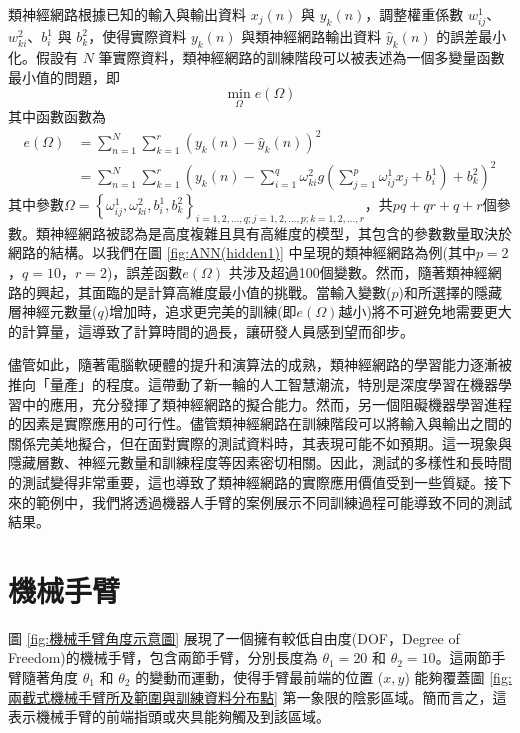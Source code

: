 類神經網路根據已知的輸入與輸出資料 $x_j(n)$ 與 $y_k(n)$，調整權重係數 $w^1_{ij}$、$w^2_{ki}$、$b^1_i$ 與 $b^2_k$，使得實際資料 $y_k(n)$ 與類神經網路輸出資料 $\hat{y}_k(n)$ 的誤差最小化。假設有 $N$ 筆實際資料，類神經網路的訓練階段可以被表述為一個多變量函數最小值的問題，即
\begin{equation}\label{eq:ANN-3}
\min_{\Omega} e(\Omega)
\end{equation}
其中函數函數為
\begin{align}\label{eq:ANN-4}\nonumber
e(\Omega)&=\sum_{n=1}^N\sum_{k=1}^r\left(y_k(n)-\hat{y}_k(n)\right)^2 \\
&=\sum_{n=1}^N\sum_{k=1}^r\left(y_k(n)-\sum_{i=1}^q\omega^2_{ki}g\left(\sum_{j=1}^p\omega^1_{ij}x_j+b^1_i\right)+b^2_k\right)^2
\end{align}
其中參數$\Omega=\left\{\omega^1_{ij},\omega^2_{ki},b^1_i,b^2_k \right\}_{i=1,2,\dots,q;j=1,2,\dots,p;k=1,2,\dots,r}$，共$pq+qr+q+r$個參數。類神經網路被認為是高度複雜且具有高維度的模型，其包含的參數數量取決於網路的結構。以我們在圖 \ref{fig:ANN(hidden1)} 中呈現的類神經網路為例(其中$p=2$，$q=10$，$r=2$)，誤差函數$e(\Omega)$ 共涉及超過100個變數。然而，隨著類神經網路的興起，其面臨的是計算高維度最小值的挑戰。當輸入變數($p$)和所選擇的隱藏層神經元數量($q$)增加時，追求更完美的訓練(即$e(\Omega)$越小)將不可避免地需要更大的計算量，這導致了計算時間的過長，讓研發人員感到望而卻步。

儘管如此，隨著電腦軟硬體的提升和演算法的成熟，類神經網路的學習能力逐漸被推向「量產」的程度。這帶動了新一輪的人工智慧潮流，特別是深度學習在機器學習中的應用，充分發揮了類神經網路的擬合能力。然而，另一個阻礙機器學習進程的因素是實際應用的可行性。儘管類神經網路在訓練階段可以將輸入與輸出之間的關係完美地擬合，但在面對實際的測試資料時，其表現可能不如預期。這一現象與隱藏層數、神經元數量和訓練程度等因素密切相關。因此，測試的多樣性和長時間的測試變得非常重要，這也導致了類神經網路的實際應用價值受到一些質疑。接下來的範例中，我們將透過機器人手臂的案例展示不同訓練過程可能導致不同的測試結果。
\section{機械手臂}
圖 \ref{fig:機械手臂角度示意圖} 展現了一個擁有較低自由度(DOF，Degree of Freedom)的機械手臂，包含兩節手臂，分別長度為 $\theta _1 = 20$ 和 $\theta _2 = 10$。這兩節手臂隨著角度 $\theta _1$ 和 $\theta _2$ 的變動而運動，使得手臂最前端的位置 ($x, y$) 能夠覆蓋圖 \ref{fig:兩截式機械手臂所及範圍與訓練資料分布點} 第一象限的陰影區域。簡而言之，這表示機械手臂的前端指頭或夾具能夠觸及到該區域。

